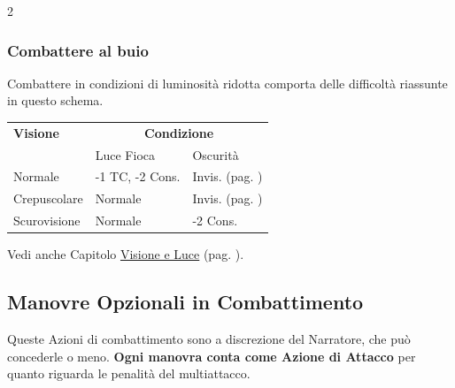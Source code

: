\begin{multicols}{2}
\subsubsection{Combattere al buio}

Combattere in condizioni di luminosità ridotta comporta delle difficoltà riassunte in questo schema.

\medskip

{\small
\noindent\begin{tabular}{lll}
	\toprule
\rowcolor{gray!20}\textbf{Visione} & \multicolumn{2}{c}{\textbf{Condizione}}\\
& Luce Fioca & Oscurità\\
\toprule
Normale & -1 TC, -2 Cons. & Invis. (pag. \pageref{invisibilita})\\
\rowcolor{gray!20}Crepuscolare & Normale & Invis. (pag. \pageref{invisibilita})\\
Scurovisione & Normale & -2 Cons.
\end{tabular}}

\medskip

Vedi anche Capitolo \hyperlink{visioneeluce}{Visione e Luce} (pag. \pageref{visioneeluce}).


\subsection{Manovre Opzionali in Combattimento}\label{azioniopzionaliincombattimento}

Queste Azioni di combattimento sono a discrezione del Narratore, che può concederle o meno. \textbf{Ogni manovra conta come Azione di Attacco} per quanto riguarda le penalità del multiattacco.


\end{multicols}
